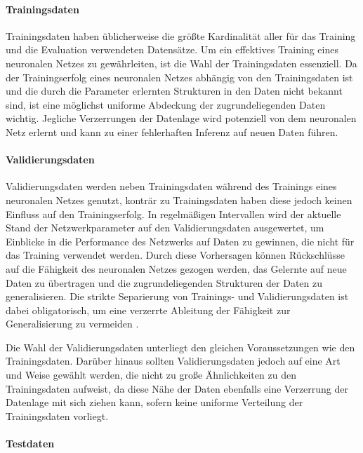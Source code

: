 \paragraph{Trainingsdaten}

Trainingsdaten haben üblicherweise die größte Kardinalität aller für das Training und die Evaluation verwendeten Datensätze. Um ein effektives Training eines neuronalen Netzes zu gewährleiten, ist die Wahl der Trainingsdaten essenziell. Da der Trainingserfolg eines neuronalen Netzes abhängig von den Trainingsdaten ist und die durch die Parameter erlernten Strukturen in den Daten nicht bekannt sind, ist eine möglichst uniforme Abdeckung der zugrundeliegenden Daten wichtig. Jegliche Verzerrungen der Datenlage wird potenziell von dem neuronalen Netz erlernt und kann zu einer fehlerhaften Inferenz auf neuen Daten führen.

\paragraph{Validierungsdaten}

Validierungsdaten werden neben Trainingsdaten während des Trainings eines neuronalen Netzes genutzt, konträr zu Trainingsdaten haben diese jedoch keinen Einfluss auf den Trainingserfolg. In regelmäßigen Intervallen wird der aktuelle Stand der Netzwerkparameter auf den Validierungsdaten ausgewertet, um Einblicke in die Performance des Netzwerks auf Daten zu gewinnen, die nicht für das Training verwendet werden. Durch diese Vorhersagen können Rückschlüsse auf die Fähigkeit des neuronalen Netzes gezogen werden, das Gelernte auf neue Daten zu übertragen und die zugrundeliegenden Strukturen der Daten zu generalisieren. Die strikte Separierung von Trainings- und Validierungsdaten ist dabei obligatorisch, um eine verzerrte Ableitung der Fähigkeit zur Generalisierung zu vermeiden \cite{nn_terminology}.

Die Wahl der Validierungsdaten unterliegt den gleichen Voraussetzungen wie den Trainingsdaten. Darüber hinaus sollten Validierungsdaten jedoch auf eine Art und Weise gewählt werden, die nicht zu große Ähnlichkeiten zu den Trainingsdaten aufweist, da diese Nähe der Daten ebenfalls eine Verzerrung der Datenlage mit sich ziehen kann, sofern keine uniforme Verteilung der Trainingsdaten vorliegt.

\paragraph{Testdaten}

